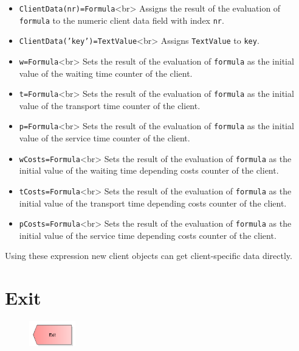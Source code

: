 \begin{itemize}
  \item \texttt{ClientData(nr)=Formula}<br>
  Assigns the result of the evaluation of \texttt{formula} to the numeric
  client data field with index \texttt{nr}. 
  \item \texttt{ClientData('key')=TextValue}<br>
  Assigns \texttt{TextValue} to \texttt{key}. 
  \item \texttt{w=Formula}<br>
  Sets the result of the evaluation of \texttt{formula} as the
  initial value of the waiting time counter of the client.   
  \item \texttt{t=Formula}<br>
  Sets the result of the evaluation of \texttt{formula} as the
  initial value of the transport time counter of the client.   
  \item \texttt{p=Formula}<br>
  Sets the result of the evaluation of \texttt{formula} as the
  initial value of the service time counter of the client. 
  \item \texttt{wCosts=Formula}<br>
  Sets the result of the evaluation of \texttt{formula} as the
  initial value of the waiting time depending costs counter of the client. 
  \item \texttt{tCosts=Formula}<br>
  Sets the result of the evaluation of \texttt{formula} as the
  initial value of the transport time depending costs counter of the client. 
  \item \texttt{pCosts=Formula}<br>
  Sets the result of the evaluation of \texttt{formula} as the
  initial value of the service time depending costs counter of the client. 
\end{itemize}

Using these expression new client objects can get client-specific data directly. 


\section{Exit}
\label{ref:ModelElementDispose}

\begin{figure}
\vspace{-22pt}
\includegraphics[width=2cm]{imageModelElementDispose.png}
\vspace{-22pt}
\end{figure}

